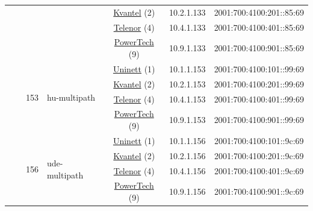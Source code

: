 \begin{small}
\begin{center}
\begin{longtable}{|c|c|c|c|c|c|c|c|}
  &  &  &  & \multicolumn{2}{|c|}{\tiny{\href{http://kvantel.no}{Kvantel} (2)}} & \tiny{10.2.1.133} & \tiny{2001:700:4100:201::85:69} \\* \cline{5-5}\cline{6-6}\cline{7-7}\cline{8-8}
  &  &  &  & \multicolumn{2}{|c|}{\tiny{\href{https://www.telenor.no}{Telenor} (4)}} & \tiny{10.4.1.133} & \tiny{2001:700:4100:401::85:69} \\* \cline{5-5}\cline{6-6}\cline{7-7}\cline{8-8}
  &  &  &  & \multicolumn{2}{|c|}{\tiny{\href{http://www.powertech.no}{PowerTech} (9)}} & \tiny{10.9.1.133} & \tiny{2001:700:4100:901::85:69} \\* \cline{3-3}\cline{4-4}\cline{5-5}\cline{6-6}\cline{7-7}\cline{8-8}
  &  & \multirow{4}{*}{\tiny{153}} & \multicolumn{1}{|l|}{\multirow{4}{*}{\tiny{hu-multipath}}} & \multicolumn{2}{|c|}{\tiny{\href{https://www.uninett.no}{Uninett} (1)}} & \tiny{10.1.1.153} & \tiny{2001:700:4100:101::99:69} \\* \cline{5-5}\cline{6-6}\cline{7-7}\cline{8-8}
  &  &  &  & \multicolumn{2}{|c|}{\tiny{\href{http://kvantel.no}{Kvantel} (2)}} & \tiny{10.2.1.153} & \tiny{2001:700:4100:201::99:69} \\* \cline{5-5}\cline{6-6}\cline{7-7}\cline{8-8}
  &  &  &  & \multicolumn{2}{|c|}{\tiny{\href{https://www.telenor.no}{Telenor} (4)}} & \tiny{10.4.1.153} & \tiny{2001:700:4100:401::99:69} \\* \cline{5-5}\cline{6-6}\cline{7-7}\cline{8-8}
  &  &  &  & \multicolumn{2}{|c|}{\tiny{\href{http://www.powertech.no}{PowerTech} (9)}} & \tiny{10.9.1.153} & \tiny{2001:700:4100:901::99:69} \\* \cline{3-3}\cline{4-4}\cline{5-5}\cline{6-6}\cline{7-7}\cline{8-8}
  &  & \multirow{4}{*}{\tiny{156}} & \multicolumn{1}{|l|}{\multirow{4}{*}{\tiny{ude-multipath}}} & \multicolumn{2}{|c|}{\tiny{\href{https://www.uninett.no}{Uninett} (1)}} & \tiny{10.1.1.156} & \tiny{2001:700:4100:101::9c:69} \\* \cline{5-5}\cline{6-6}\cline{7-7}\cline{8-8}
  &  &  &  & \multicolumn{2}{|c|}{\tiny{\href{http://kvantel.no}{Kvantel} (2)}} & \tiny{10.2.1.156} & \tiny{2001:700:4100:201::9c:69} \\* \cline{5-5}\cline{6-6}\cline{7-7}\cline{8-8}
  &  &  &  & \multicolumn{2}{|c|}{\tiny{\href{https://www.telenor.no}{Telenor} (4)}} & \tiny{10.4.1.156} & \tiny{2001:700:4100:401::9c:69} \\* \cline{5-5}\cline{6-6}\cline{7-7}\cline{8-8}
  &  &  &  & \multicolumn{2}{|c|}{\tiny{\href{http://www.powertech.no}{PowerTech} (9)}} & \tiny{10.9.1.156} & \tiny{2001:700:4100:901::9c:69} \\* \cline{3-3}\cline{4-4}\cline{5-5}\cline{6-6}\cline{7-7}\cline{8-8}

\end{longtable}
\end{center}
\end{small}
